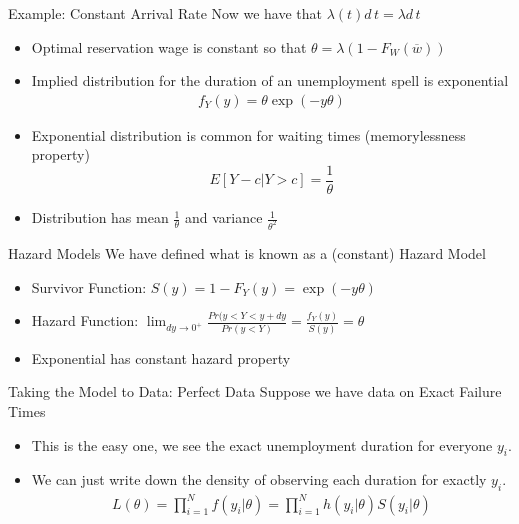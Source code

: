 \documentclass[aspectratio=169]{beamer}
\begin{document}
\begin{frame}{Example: Constant Arrival Rate}
Now we have that $\lambda(t) d\,t= \lambda d\,t$
\begin{itemize}
\item Optimal reservation wage is constant so that $\theta = \lambda (1 - F_{W}(\overline{w}) )$
\item Implied distribution for the \alert{duration} of an unemployment \alert{spell} is \alert{exponential} 
\begin{align*}
f_Y(y) = \theta \exp(-y \theta)
\end{align*}
\item Exponential distribution is common for waiting times (\alert{memorylessness property}) $$E[Y-c | Y > c] = \frac{1}{\theta}$$
\item Distribution has mean $\frac{1}{\theta}$ and variance $\frac{1}{\theta^2}$
\end{itemize}
\end{frame}


\begin{frame}{Hazard Models}
We have defined what is known as a (constant) \alert{Hazard Model}
\begin{itemize}
\item Survivor Function: $S(y) = 1 - F_Y(y) = \exp(-y \theta)$
\item Hazard Function: $\lim_{dy \rightarrow 0^{+}} \frac{Pr(y < Y < y +dy}{Pr(y < Y)} =\frac{f_Y(y)}{S(y)} = \theta$
\item Exponential has \alert{constant hazard property}
\end{itemize}
\end{frame}

\begin{frame}{Taking the Model to Data: Perfect Data}
Suppose we have data on \alert{Exact Failure Times}
\begin{itemize}
\item This is the easy one, we see the exact unemployment duration for everyone $y_i$.
\item We can just write down the density of observing each duration for exactly $y_i$.
\begin{align*}
L(\theta) = \prod_{i=1}^N f(y_i | \theta) = \prod_{i=1}^N h(y_i| \theta) S(y_i |\theta)
\end{align*}
\end{itemize}
\end{frame}
\end{document}
